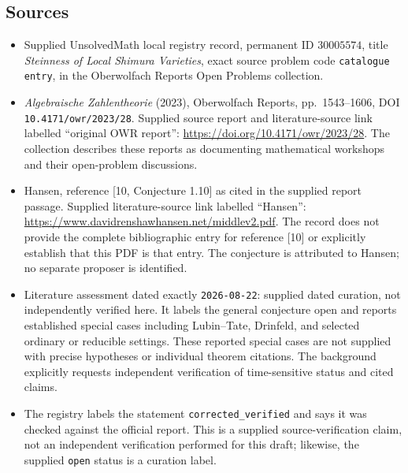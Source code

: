 \documentclass[11pt]{article}
\begin{document}
\subsection{Sources}
\begin{itemize}
\item Supplied UnsolvedMath local registry record, permanent ID \(30005574\), title \emph{Steinness of Local Shimura Varieties}, exact source problem code \texttt{catalogue entry}, in the Oberwolfach Reports Open Problems collection.
\item \emph{Algebraische Zahlentheorie} (2023), Oberwolfach Reports, pp.\ 1543--1606, DOI \texttt{10.4171/owr/2023/28}. Supplied source report and literature-source link labelled ``original OWR report'': \url{https://doi.org/10.4171/owr/2023/28}. The collection describes these reports as documenting mathematical workshops and their open-problem discussions.
\item Hansen, reference [10, Conjecture 1.10] as cited in the supplied report passage. Supplied literature-source link labelled ``Hansen'': \url{https://www.davidrenshawhansen.net/middlev2.pdf}. The record does not provide the complete bibliographic entry for reference [10] or explicitly establish that this PDF is that entry. The conjecture is attributed to Hansen; no separate proposer is identified.
\item Literature assessment dated exactly \texttt{2026-08-22}: supplied dated curation, not independently verified here. It labels the general conjecture open and reports established special cases including Lubin--Tate, Drinfeld, and selected ordinary or reducible settings. These reported special cases are not supplied with precise hypotheses or individual theorem citations. The background explicitly requests independent verification of time-sensitive status and cited claims.
\item The registry labels the statement \texttt{corrected\_verified} and says it was checked against the official report. This is a supplied source-verification claim, not an independent verification performed for this draft; likewise, the supplied \texttt{open} status is a curation label.
\end{itemize}
\end{document}
